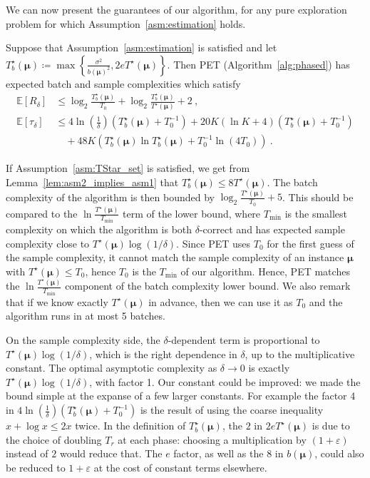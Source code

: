 We can now present the guarantees of our algorithm, for any pure exploration problem for which Assumption~\ref{asm:estimation} holds.

\begin{theorem}\label{thm:compexity_upper_bounds}
Suppose that Assumption~\ref{asm:estimation} is satisfied and let $T^\star_b(\bm\mu) \coloneqq \max\left\{\frac{\sigma^2}{b(\bm\mu)^2}, 2 e T^\star(\bm\mu) \right\}$.
Then PET (Algorithm~\ref{alg:phased}) has expected batch and sample complexities which satisfy
\begin{align*}
\mathbb{E}\left[R_\delta\right]
&\le \log_2 \frac{T^\star_b(\bm\mu)}{T_0} + \log_2 \frac{T^\star_b(\bm\mu)}{T^\star(\bm\mu)} + 2
\: , \\
\mathbb{E}\left[\tau_\delta\right]
&\le 4 \ln \left(\frac{1}{\delta}\right) (T^\star_b(\bm\mu) + T_0^{-1})+ 20K (\ln K + 4) (T^\star_b(\bm\mu) + T_0^{-1})
\\ & \quad + 48 K (T^\star_b(\bm\mu) \ln T^\star_b(\bm\mu) + T_0^{-1} \ln(4T_0))
\: .
\end{align*}
\end{theorem}


If Assumption~\ref{asm:TStar_set} is satisfied, we get from Lemma~\ref{lem:asm2_implies_asm1} that $T^\star_b(\bm\mu) \le 8 T^\star(\bm\mu)$.
The batch complexity of the algorithm is then bounded by $\log_2 \frac{T^\star(\bm\mu)}{T_0} + 5$.
This should be compared to the $\ln \frac{T^\star(\bm\mu)}{T_{\min}}$ term of the lower bound, where $T_{\min}$ is the smallest complexity on which the algorithm is both $\delta$-correct and has expected sample complexity close to $T^\star(\bm\mu) \log(1/\delta)$.
Since PET uses $T_0$ for the first guess of the sample complexity, it cannot match the sample complexity of an instance $\bm\mu$ with $T^\star(\bm\mu) \le T_0$, hence $T_0$ is the $T_{\min}$ of our algorithm.
Hence, PET matches the $\ln \frac{T^\star(\bm\mu)}{T_{\min}}$ component of the batch complexity lower bound. 
We also remark that if we know exactly $T^\star(\bm\mu)$ in advance, then we can use it as $T_0$ and the algorithm runs in at most 5 batches.

On the sample complexity side, the $\delta$-dependent term is proportional to $T^\star(\bm\mu) \log(1/\delta)$, which is the right dependence in $\delta$, up to the multiplicative constant. The optimal asymptotic complexity as $\delta \to 0$ is exactly $T^\star(\bm\mu) \log(1/\delta)$, with factor 1.
Our constant could be improved: we made the bound simple at the expanse of a few larger constants.
For example the factor 4 in $4 \ln \left(\frac{1}{\delta}\right) (T^\star_b(\bm\mu) + T_0^{-1})$ is the result of using the coarse inequality $x + \log x \le 2 x$ twice.
In the definition of $T_b^\star(\bm\mu)$, the $2$ in $2eT^\star(\bm\mu)$ is due to the choice of doubling $T_r$ at each phase: choosing a multiplication by $(1+\varepsilon)$ instead of $2$ would reduce that. The $e$ factor, as well as the 8 in $b(\bm\mu)$, could also be reduced to $1 + \varepsilon$ at the cost of constant terms elsewhere.


